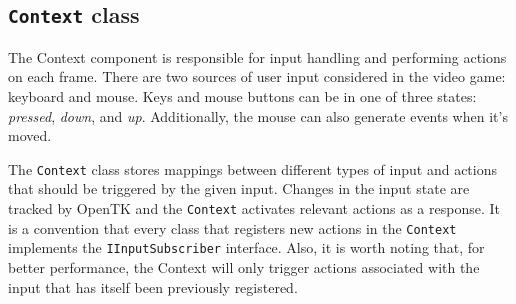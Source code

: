\subsection{\texttt{Context} class} \label{subsec:context-class}
The Context component is responsible for input handling and performing actions on each frame.
There are two sources of user input considered in the video game: keyboard and mouse.
Keys and mouse buttons can be in one of three states: \textit{pressed}, \textit{down}, and \textit{up}.
Additionally, the mouse can also generate events when it's moved.

The \texttt{Context} class stores mappings between different types of input and actions that should be triggered by the given input.
Changes in the input state are tracked by OpenTK and the \texttt{Context} activates relevant actions as a response.
It is a convention that every class that registers new actions in the \texttt{Context} implements the \texttt{IInputSubscriber} interface.
Also, it is worth noting that, for better performance, the Context will only trigger actions associated with the input that has itself been previously registered.